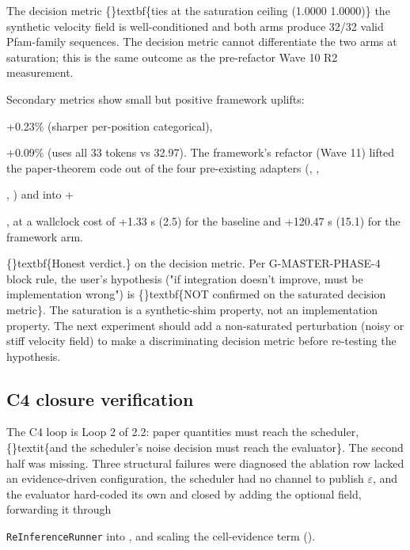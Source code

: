 \documentclass{article}
\begin{document}
The decision metric  \{\}textbf\{ties at the saturation ceiling (1.0000  1.0000)\}  the synthetic velocity field is well-conditioned and both arms produce 32/32 valid Pfam-family sequences. The decision metric cannot differentiate the two arms at saturation; this is the same outcome as the pre-refactor Wave 10 R2 measurement.

Secondary metrics show small but positive framework uplifts:

 +0.23\% (sharper per-position categorical),

 +0.09\% (uses all 33 tokens vs 32.97). The framework's refactor (Wave 11) lifted the paper-theorem code out of the four pre-existing adapters (, ,

, ) and into  +

, at a wallclock cost of +1.33 s (2.5) for the baseline and +120.47 s (15.1) for the framework arm.

\{\}textbf\{Honest verdict.\}  on the decision metric. Per  G-MASTER-PHASE-4 block rule, the user's hypothesis ("if integration doesn't improve, must be implementation wrong") is \{\}textbf\{NOT confirmed on the saturated decision metric\}. The saturation is a synthetic-shim property, not an implementation property. The next experiment should add a non-saturated perturbation (noisy or stiff velocity field) to make  a discriminating decision metric before re-testing the hypothesis.

\subsection{C4 closure verification}
The C4 loop is Loop 2 of 2.2: paper quantities must reach the scheduler, \{\}textit\{and the scheduler's noise decision must reach the evaluator\}. The second half was missing. Three structural failures were diagnosed  the ablation row lacked an evidence-driven configuration, the scheduler had no channel to publish $\varepsilon$, and the evaluator hard-coded its own   and closed by adding the optional  field, forwarding it through

\texttt{ReInferenceRunner} into , and scaling the cell-evidence term ().
\end{document}
